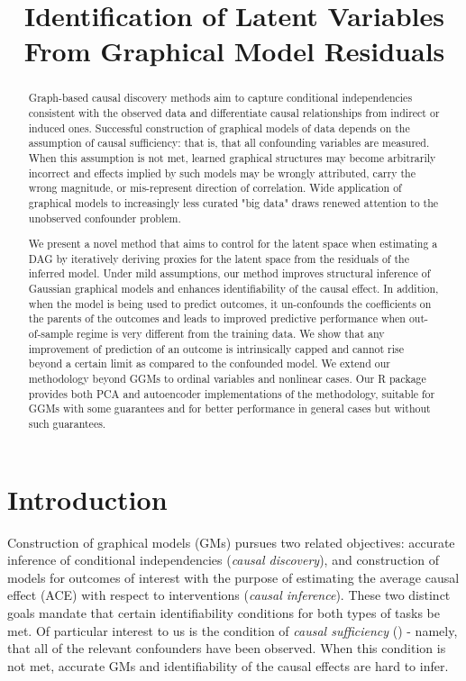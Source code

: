 \documentclass{article}
\title{Identification of Latent Variables From Graphical Model Residuals}
\begin{document}
\maketitle

\begin{abstract}
Graph-based causal discovery methods aim to capture conditional independencies consistent with the observed data and differentiate causal relationships from indirect or induced ones.  Successful construction of graphical models of data depends on the assumption of causal sufficiency: that is, that all confounding variables are measured. When this assumption is not met, learned graphical structures may become arbitrarily incorrect and effects implied by such models may be wrongly attributed, carry the wrong magnitude, or mis-represent direction of correlation.  Wide application of graphical models to increasingly less curated "big data" draws renewed attention to the unobserved confounder problem.  

We present a novel method that aims to control for the latent space when estimating a DAG by iteratively deriving proxies for the latent space from the residuals of the inferred model.  Under mild assumptions, our method improves structural inference of Gaussian graphical models and enhances identifiability of the causal effect. In addition, when the model is being used to predict outcomes, it un-confounds the coefficients on the parents of the outcomes and leads to improved predictive performance when out-of-sample regime is very different from the training data.  We show that any improvement of prediction of an outcome is intrinsically capped and cannot rise beyond a certain limit as compared to the confounded model.  We extend our methodology beyond GGMs to ordinal variables and nonlinear cases.  Our R package provides both PCA and autoencoder implementations of the methodology, suitable for GGMs with some guarantees and for better performance in general cases but without such guarantees. 
\end{abstract}

\section{Introduction}
\label{introduction}

Construction of graphical models (GMs) pursues two related objectives:
accurate inference of conditional independencies (\textit{causal
  discovery}), and construction of models for outcomes of interest
with the purpose of estimating the average causal effect (ACE) with
respect to interventions \cite{pearl_causality:_2000,hernan_estimating_2006} (\textit{causal inference}).  These two distinct goals mandate that certain identifiability conditions for both types of tasks be met.  Of particular interest to us is the condition of \textit{causal sufficiency} (\cite{spirtes_causation_1993}) - namely, that all of the relevant confounders have been observed.  When this condition is not met, accurate GMs and identifiability of the causal effects are hard to infer.
\end{document}
